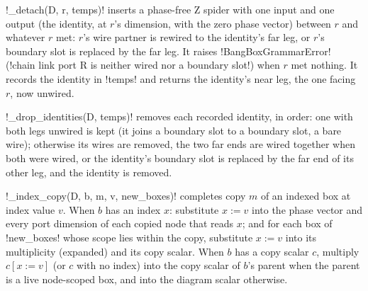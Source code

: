\begin{definition}\label{def:diagrams-detach}
\py!_detach(D, r, temps)! inserts a phase-free Z spider with one input and one output (the identity, at $r$'s dimension, with the zero phase vector) between $r$ and whatever $r$ met: $r$'s wire partner is rewired to the identity's far leg, or $r$'s boundary slot is replaced by the far leg. It raises \py!BangBoxGrammarError! (\code!chain link port R is neither wired nor a boundary slot!) when $r$ met nothing. It records the identity in \py!temps! and returns the identity's near leg, the one facing $r$, now unwired.
\end{definition}

\begin{definition}\label{def:diagrams-drop}
\py!_drop_identities(D, temps)! removes each recorded identity, in order: one with both legs unwired is kept (it joins a boundary slot to a boundary slot, a bare wire); otherwise its wires are removed, the two far ends are wired together when both were wired, or the identity's boundary slot is replaced by the far end of its other leg, and the identity is removed.
\end{definition}

\begin{definition}\label{def:diagrams-index-copy}
\py!_index_copy(D, b, m, v, new_boxes)! completes copy $m$ of an indexed box at index value $v$. When $b$ has an index $x$: substitute $x:=v$ into the phase vector and every port dimension of each copied node that reads $x$; and for each box of \py!new_boxes! whose scope lies within the copy, substitute $x:=v$ into its multiplicity (expanded) and its copy scalar. When $b$ has a copy scalar $c$, multiply $c[x:=v]$ (or $c$ with no index) into the copy scalar of $b$'s parent when the parent is a live node-scoped box, and into the diagram scalar otherwise.
\end{definition}

